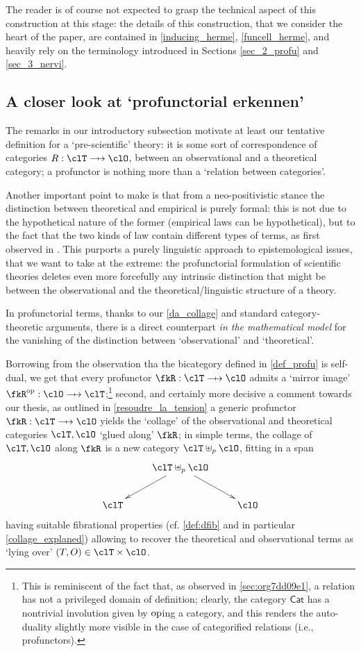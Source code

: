 The reader is of course not expected to grasp the technical aspect of this construction at this stage: the details of this construction, that we consider the heart of the paper, are contained in \autoref{inducing_herme}, \autoref{funcell_herme}, and heavily rely on the terminology introduced in Sections \ref{sec_2_profu} and \ref{sec_3_nervi}.

\subsection{A closer look at `profunctorial erkennen'}
The remarks in our introductory subsection motivate at least our tentative definition for a `pre-scientific' theory: it is some sort of correspondence of categories $R : \clT \pto \clO$, between an observational and a theoretical category; a profunctor is nothing more than a `relation between categories'.

Another important point to make is that from a neo-positivistic stance the distinction between theoretical and empirical is purely formal: this is not due to the hypothetical nature of the former (empirical laws can be hypothetical), but to the fact that the two kinds of law contain different types of terms, as first observed in \cite{carnap56}. This purports a purely linguistic approach to epistemological issues, that we want to take at the extreme: the profunctorial formulation of scientific theories deletes even more forcefully any intrinsic distinction that might be between the observational and the theoretical\fshyp{}linguistic structure of a theory.

In profunctorial terms, thanks to our \autoref{da_collage} and standard category\hyp{}theoretic arguments, there is a direct counterpart \emph{in the mathematical model} for the vanishing of the distinction between `observational' and `theoretical'.

Borrowing from \cite{benabou2000distributors} the observation tha the bicategory defined in \autoref{def_profu} is self-dual, we get that every profunctor $\fkR : \clT \pto \clO$ admits a `mirror image' $\fkR^\op : \clO \pto \clT$;\footnote{This is reminiscent of the fact that, as observed in \autoref{sec:org7dd09e1}, a relation has not a privileged domain of definition; clearly, the category $\mathsf{Cat}$ has a nontrivial involution given by $\text{op}$ing a category, and this renders the auto-duality slightly more visible in the case of categorified relations (i.e., profunctors).} second, and certainly more decisive a comment towards our thesis, as outlined in \autoref{resoudre_la_tension} a generic profunctor $\fkR : \clT \pto\clO$ yields the `collage' of the observational and theoretical categories $\clT,\clO$ `glued along' $\fkR$; in simple terms, the collage of $\clT,\clO$ along $\fkR$ is a new category $\clT\uplus_p\clO$, fitting in a span
\[ 
  \vcenter{\xymatrix{
      & \clT\uplus_p \clO \ar[dr]\ar[dl]& \\
      \clT  && \clO
    }} 
\] 
having suitable fibrational properties (cf. \autoref{def:dfib} and in particular \autoref{collage_explaned}) allowing to recover the theoretical and observational terms as `lying over' $(T,O)\in\clT\times\clO$.

